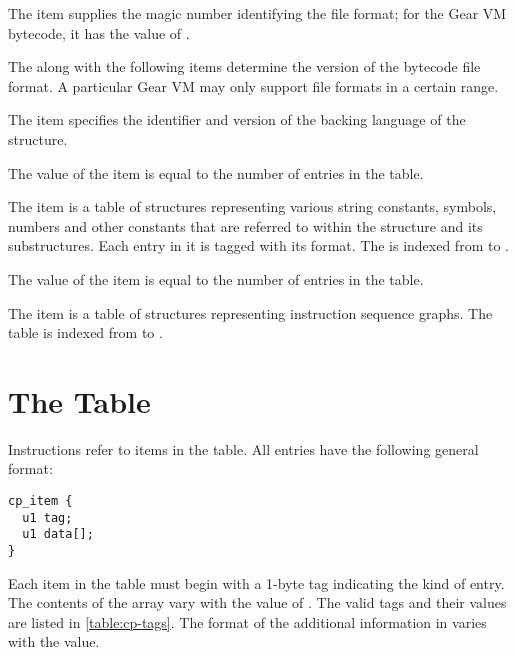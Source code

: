 \begin{description}[font=\ttfamily\mdseries,style=nextline]
  \item[magic]
  The  item supplies the magic number identifying the  file format; for the Gear VM bytecode, it has the value of . 
  \item[major\_version, minor\_version]
  The  along with the following  items determine the version of the bytecode file format. A particular Gear VM may only support file formats in a certain range. 
  \item[dialect]
  The  item specifies the identifier and version of the backing language of the  structure. 
  \item[constant\_pool\_count]
  The value of the  item is equal to the number of entries in the  table. 
  \item[constant\_pool]
  The  item is a table of structures representing various string constants, symbols, numbers and other constants that are referred to within the  structure and its substructures. Each entry in it is tagged with its format. The  is indexed from  to . 
  \item[graphs\_count]
  The value of the  item is equal to the number of entries in the  table. 
  \item[graphs]
  The  item is a table of structures representing instruction sequence graphs. The  table is indexed from  to . 
\end{description}





\section{The  Table}

Instructions refer to items in the  table. All entries have the following general format:
\begin{lstlisting}
cp_item {
  u1 tag;
  u1 data[];
}
\end{lstlisting}

Each item in the  table must begin with a 1-byte tag indicating the kind of  entry. The contents of the  array vary with the value of . The valid tags and their values are listed in \autoref{table:cp-tags}. The format of the additional information in  varies with the  value. 

